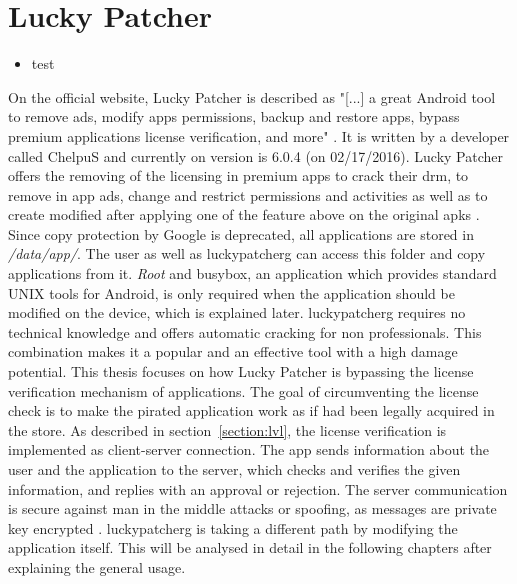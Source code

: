 \section{Lucky Patcher} \label{section:luckypatcher-explain}
\begin{itemize}
    \item test
\end{itemize}
On the official website, Lucky Patcher is described as "[...] a great Android tool to remove ads, modify apps permissions, backup and restore apps, bypass premium applications license verification, and more" \cite{luckyPatcherOfficial}.
It is written by a developer called ChelpuS and currently on version is 6.0.4 (on 02/17/2016).
\newline
Lucky Patcher offers the removing of the licensing in premium apps to crack their \gls{drm}, to remove in app ads, change and restrict permissions and activities as well as to create modified after applying one of the feature above on the original \gls{apk}s \cite{luckyPatcherOfficial}.
Since copy protection by Google is deprecated, all applications are stored in \textit{/data/app/}.
The user as well as \gls{luckypatcherg} can access this folder and copy applications from it.
\textit{Root} and busybox, an application which provides standard UNIX tools for Android\cite{busyboxApp}, is only required when the application should be modified on the device, which is explained later.
\gls{luckypatcherg} requires no technical knowledge and offers automatic cracking for non professionals.
This combination makes it a popular and an effective tool with a high damage potential. \cite{munteanLicense}
\newline
This thesis focuses on how Lucky Patcher is bypassing the license verification mechanism of applications.
The goal of circumventing the license check is to make the pirated application work as if had been legally acquired in the store.
As described in section~\ref{section:lvl}, the license verification is implemented as client-server connection.
The app sends information about the user and the application to the server, which checks and verifies the given information, and replies with an approval or rejection.
The server communication is secure against man in the middle attacks or spoofing, as messages are private key encrypted \cite{munteanLicense}.
\gls{luckypatcherg} is taking a different path by modifying the application itself. This will be analysed in detail in the following chapters after explaining the general usage.
\newline
